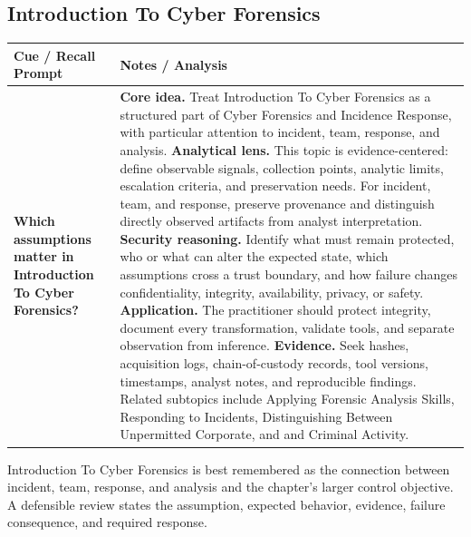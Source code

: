 \documentclass[11pt]{article}
\newcommand{\CornellHeader}{%
\rowcolor{Navy}\color{white}\bfseries Cue / Recall Prompt & \color{white}\bfseries Notes / Analysis\\\hline}
\newcommand{\CornellRow}[2]{%
\cellcolor{CueGray}\RaggedRight\textbf{#1} & \RaggedRight #2\\\hline}
\begin{document}
\subsection*{Introduction To Cyber Forensics}
\begin{longtable}{>{\RaggedRight\arraybackslash}p{}|>{\RaggedRight\arraybackslash}p{}}
\CornellHeader
\CornellRow{Which assumptions matter in Introduction To Cyber Forensics?}{\textbf{Core idea.} Treat Introduction To Cyber Forensics as a structured part of Cyber Forensics and Incidence Response, with particular attention to incident, team, response, and analysis. \textbf{Analytical lens.} This topic is evidence-centered: define observable signals, collection points, analytic limits, escalation criteria, and preservation needs. For incident, team, and response, preserve provenance and distinguish directly observed artifacts from analyst interpretation. \textbf{Security reasoning.} Identify what must remain protected, who or what can alter the expected state, which assumptions cross a trust boundary, and how failure changes confidentiality, integrity, availability, privacy, or safety. \textbf{Application.} The practitioner should protect integrity, document every transformation, validate tools, and separate observation from inference. \textbf{Evidence.} Seek hashes, acquisition logs, chain-of-custody records, tool versions, timestamps, analyst notes, and reproducible findings. Related subtopics include Applying Forensic Analysis Skills, Responding to Incidents, Distinguishing Between Unpermitted Corporate, and and Criminal Activity.}
\end{longtable}
\begin{topicsummary}
Introduction To Cyber Forensics is best remembered as the connection between incident, team, response, and analysis and the chapter's larger control objective. A defensible review states the assumption, expected behavior, evidence, failure consequence, and required response.
\end{topicsummary}
\end{document}
